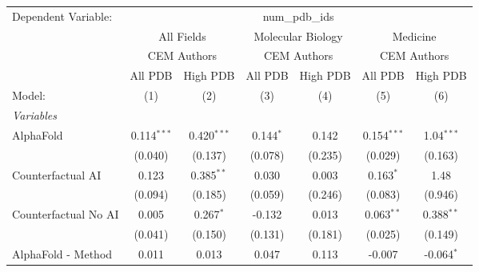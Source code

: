 \begingroup
\centering
\begin{tabular}{lcccccc}
   \tabularnewline \midrule \midrule
   Dependent Variable: & \multicolumn{6}{c}{num\_pdb\_ids}\\
 & \multicolumn{2}{c}{All Fields} & \multicolumn{2}{c}{Molecular Biology} & \multicolumn{2}{c}{Medicine} \\
\cmidrule(lr){2-3} \cmidrule(lr){4-5} \cmidrule(lr){6-7}
 & \multicolumn{2}{c}{CEM Authors} & \multicolumn{2}{c}{CEM Authors} & \multicolumn{2}{c}{CEM Authors} \\
\cmidrule(lr){2-3} \cmidrule(lr){4-5} \cmidrule(lr){6-7}
 & \multicolumn{1}{c}{All PDB} & \multicolumn{1}{c}{High PDB} & \multicolumn{1}{c}{All PDB} & \multicolumn{1}{c}{High PDB} & \multicolumn{1}{c}{All PDB} & \multicolumn{1}{c}{High PDB} \\
\cmidrule(lr){2-2} \cmidrule(lr){3-3} \cmidrule(lr){4-4} \cmidrule(lr){5-5} \cmidrule(lr){6-6} \cmidrule(lr){7-7}
   Model:                                                     & (1)           & (2)            & (3)           & (4)           & (5)           & (6)\\  
   \midrule
   \emph{Variables}\\
   AlphaFold                                                  & 0.114$^{***}$ & 0.420$^{***}$  & 0.144$^{*}$   & 0.142         & 0.154$^{***}$ & 1.04$^{***}$\\   
                                                              & (0.040)       & (0.137)        & (0.078)       & (0.235)       & (0.029)       & (0.163)\\   
   Counterfactual AI                                          & 0.123         & 0.385$^{**}$   & 0.030         & 0.003         & 0.163$^{*}$   & 1.48\\   
                                                              & (0.094)       & (0.185)        & (0.059)       & (0.246)       & (0.083)       & (0.946)\\   
   Counterfactual No AI                                       & 0.005         & 0.267$^{*}$    & -0.132        & 0.013         & 0.063$^{**}$  & 0.388$^{**}$\\   
                                                              & (0.041)       & (0.150)        & (0.131)       & (0.181)       & (0.025)       & (0.149)\\   
   AlphaFold - Method                                         & 0.011         & 0.013          & 0.047         & 0.113         & -0.007        & -0.064$^{*}$\\   

\end{tabular}
